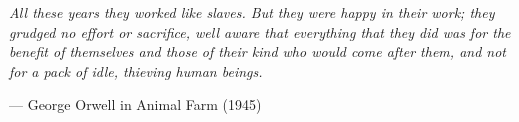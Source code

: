 \thispagestyle{empty}

\hfill

\vfill

\begin{flushright}
  
  \hangindent=15pt {\slshape All these years they worked like
    slaves. But they were happy in their work; they grudged no effort
    or sacrifice, well aware that everything that they did was for the
    benefit of themselves and those of their kind who would come after
    them, and not for a pack of idle, thieving human beings.}
  
  \medskip

  --- George Orwell in Animal Farm (1945)

\end{flushright}

\vfill

